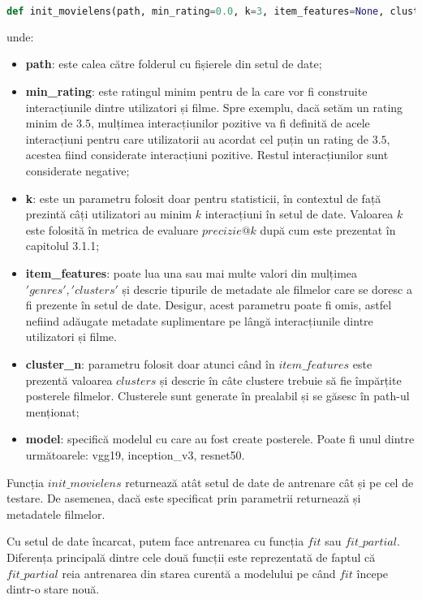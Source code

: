 \begin{lstlisting}[language=Python, caption=Funcția de inițializare a bazei de date]
def init_movielens(path, min_rating=0.0, k=3, item_features=None, cluster_n=18, model='vgg19')
\end{lstlisting}
unde:
\begin{itemize}
	\item \textbf{path}: este calea către folderul cu fișierele din setul de date;
	\item \textbf{min\_rating}: este ratingul minim pentru de la care vor fi construite interacțiunile dintre utilizatori și filme. Spre exemplu, dacă setăm un rating minim de $3.5$, mulțimea interacțiunilor pozitive va fi definită de acele interacțiuni pentru care utilizatorii au acordat cel puțin un rating de $3.5$, acestea fiind considerate interacțiuni pozitive. Restul interacțiunilor sunt considerate negative;
	\item \textbf{k}: este un parametru folosit doar pentru statisticii, în contextul de față prezintă câți utilizatori au minim $k$ interacțiuni în setul de date. Valoarea $k$ este folosită în metrica de evaluare $precizie@k$ după cum este prezentat în capitolul 3.1.1; 
	\item \textbf{item\_features}: poate lua una sau mai multe valori din mulțimea ${'genres', 'clusters'}$ și descrie tipurile de metadate ale filmelor care se doresc a fi prezente în setul de date. Desigur, acest parametru poate fi omis, astfel nefiind adăugate metadate suplimentare pe lângă interacțiunile dintre utilizatori și filme.
	\item \textbf{cluster\_n}: parametru folosit doar atunci când în $item\_features$ este prezentă valoarea $clusters$ și descrie în câte clustere trebuie să fie împărțite posterele filmelor. Clusterele sunt generate în prealabil și se găsesc în path-ul menționat;
	\item \textbf{model}: specifică modelul cu care au fost create posterele. Poate fi unul dintre următoarele: vgg19, inception\_v3, resnet50.
\end{itemize}
Funcția $init\_movielens$ returnează atât setul de date de antrenare cât și pe cel de testare. De asemenea, dacă este specificat prin parametrii returnează și metadatele filmelor.

Cu setul de date încarcat, putem face antrenarea cu funcția $fit$ sau $fit\_partial$. Diferența principală dintre cele două funcții este reprezentată de faptul că $fit\_partial$ reia antrenarea din starea curentă a modelului pe când $fit$ începe dintr-o stare nouă. 

